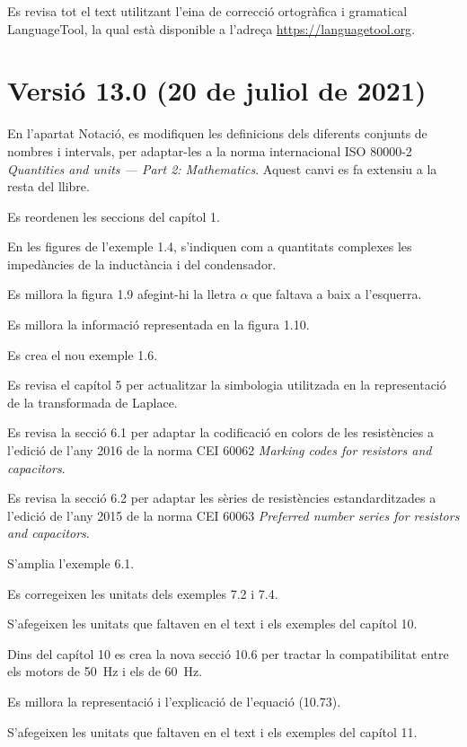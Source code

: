 Es revisa tot el text utilitzant l'eina de correcció ortogràfica i gramatical \textsf{LanguageTool}, la qual està disponible a l'adreça \href{https://languagetool.org/}{https:/\!\!/languagetool.org}.


\section*{Versió 13.0 (20 de juliol de 2021)}

En l'apartat Notació, es modifiquen les definicions dels diferents conjunts de nombres i intervals, per adaptar-les a la norma internacional ISO 80000-2 \textit{Quantities and units --- Part 2: Mathematics}. Aquest canvi es fa extensiu a la resta del llibre.

Es reordenen les seccions del capítol 1.

En les figures de l'exemple 1.4, s'indiquen com a quantitats complexes les impedàncies de la inductància i del condensador.

Es millora la figura 1.9 afegint-hi la lletra $\alpha$ que faltava  a baix a l'esquerra.

Es millora la informació representada en la figura 1.10.

Es crea el nou exemple 1.6.

Es revisa el capítol 5 per actualitzar la simbologia utilitzada en la representació de la transformada de Laplace.

Es revisa la secció 6.1 per adaptar la codificació en colors de les resistències a l'edició de l'any 2016 de la norma CEI 60062 \textit{Marking codes for resistors and capacitors}.

Es revisa la secció 6.2 per adaptar les sèries de resistències estandarditzades a l'edició de l'any 2015 de la norma CEI 60063 \textit{Preferred number series for resistors and capacitors}.

S'amplia l'exemple 6.1.

Es corregeixen les unitats dels exemples 7.2 i 7.4.

S'afegeixen les unitats que faltaven en el text i els exemples del capítol 10. 

Dins del capítol 10 es crea la nova secció 10.6 per tractar la compatibilitat entre els motors de \qty{50}{Hz} i els de \qty{60}{Hz}.

Es millora la representació i l'explicació de l'equació (10.73).

S'afegeixen les unitats que faltaven en el text i els exemples del capítol 11.

